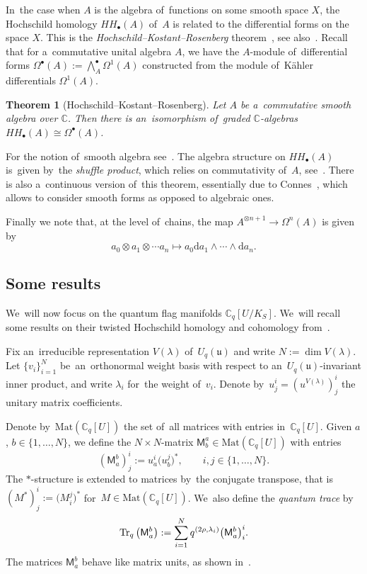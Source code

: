 \documentclass[10pt,a4paper]{amsart}
\numberwithin{equation}{section}
\newcommand{\Uqu}{U_q(\mathfrak{u})}
\newcommand{\CqU}{\mathbb{C}_q[U]}
\newcommand{\Cqflag}{\mathbb{C}_q[U / K_S]}
\newcommand{\diff}{\mathrm{d}}
\newcommand{\bbC}{\mathbb{C}}
\newcommand{\matuni}{\mathsf{M}}
\newtheorem*{theorem*}{Theorem}
\begin{document}
In~the case when $A$ is the algebra of~functions on some smooth space $X$, the Hoch\-schild homo\-logy $HH_\bullet(A)$ of~$A$ is related to the differential forms on the space $X$.
This is the \emph{Hoch\-schild--Kostant--Rosenberg} theorem~\cite{hkr}, see also~\cite[Theorem~3.4.4]{loday}.
Recall that for a~commutative unital algebra $A$, we have the $A$-module of~differential forms $\Omega^\bullet(A) := \bigwedge^\bullet_A \Omega^1(A)$ constructed from the module of~K\"ahler differentials $\Omega^1(A)$.

\begin{theorem*}[Hoch\-schild--Kostant--Rosenberg]
Let $A$ be a~commutative smooth algebra over $\bbC$.
Then there is an~isomorphism of~graded $\mathbb{C}$-algebras $HH_\bullet(A) \cong \Omega^\bullet(A)$.
\end{theorem*}

For the notion of~smooth algebra see~\cite[Section~3.4.1]{loday}.
The algebra structure on $HH_\bullet(A)$ is~given by~the \emph{shuffle product}, which relies on commutativity of~$A$, see~\cite[Section~4.2]{loday}.
There is also a~continuous version of~this theorem, essentially due to Connes~\cite{connes}, which allows to consider smooth forms as opposed to algebraic ones.

Finally we note that, at the level of~chains, the map $A^{\otimes n + 1} \to \Omega^n(A)$ is given by
\[
a_0 \otimes a_1 \otimes \cdots a_n \mapsto a_0 \diff a_1 \wedge \cdots \wedge \diff a_n.
\]

\subsection{Some results}

We~will now focus on the quantum flag manifolds $\Cqflag$.
We~will recall some results on their twisted Hoch\-schild homology and cohomology from~\cite{twist-hoch}.

Fix an~irreducible representation $V(\lambda)$ of~$\Uqu$ and write $N := \dim V(\lambda)$.
Let $\{v_i\}_{i = 1}^N$ be~an~ort\-ho\-normal weight basis with respect to an~$\Uqu$-invariant inner product, and write $\lambda_i$ for~the weight of~$v_i$.
Denote by~$u^i_j = (u^{V(\lambda)})^i_j$ the unitary matrix coefficients.

Denote by~$\mathrm{Mat}(\CqU)$ the set of~all matrices with entries in~$\CqU$.
Given $a$, $b \in \{ 1, \dots, N \}$, we define the $N \times N$-matrix $\matuni^a_b \in \mathrm{Mat}(\CqU)$ with entries
\[
(\matuni^b_a)^i_j := u^i_a \big(u^j_b\big)^*, \qquad
i, j \in \{ 1, \dots, N \}.
\]
The $*$-structure is extended to matrices by~the conjugate transpose, that is $(M^*)^i_j := \big(M^j_i\big)^*$ for~$M \in \mathrm{Mat}(\CqU)$.
We~also define the \emph{quantum trace} by
\[
\mathop{\rm Tr}\nolimits_q\big(\matuni^b_a\big) := \sum_{i = 1}^N q^{(2 \rho, \lambda_i)} \big(\matuni^b_a\big)^i_i.
\]
The matrices $\matuni^b_a$ behave like matrix units, as shown in~\cite[Proposition~3.3]{twist-hoch}.
\end{document}
